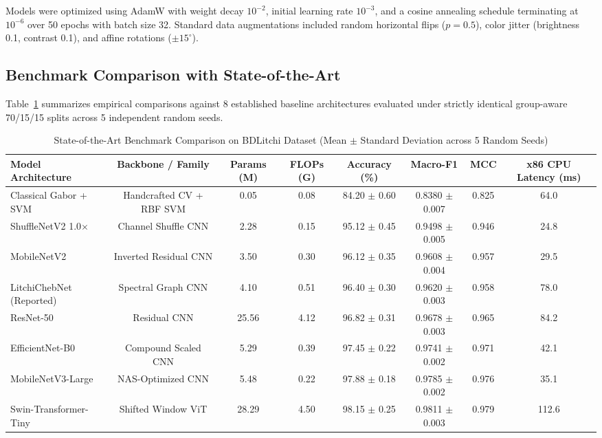 \documentclass[journal]{IEEEtran}
\begin{document}
Models were optimized using AdamW with weight decay $10^{-2}$, initial learning rate $10^{-3}$, and a cosine annealing schedule terminating at $10^{-6}$ over 50 epochs with batch size 32. Standard data augmentations included random horizontal flips ($p = 0.5$), color jitter (brightness 0.1, contrast 0.1), and affine rotations ($\pm 15^\circ$).

\subsection{Benchmark Comparison with State-of-the-Art}
Table~\ref{tab:sota} summarizes empirical comparisons against 8 established baseline architectures evaluated under strictly identical group-aware 70/15/15 splits across 5 independent random seeds.

\begin{table}[t]
\centering
\caption{State-of-the-Art Benchmark Comparison on BDLitchi Dataset (Mean $\pm$ Standard Deviation across 5 Random Seeds)}
\label{tab:sota}
\begin{tabular}{lccccccc}
\toprule
\textbf{Model Architecture} & \textbf{Backbone / Family} & \textbf{Params (M)} & \textbf{FLOPs (G)} & \textbf{Accuracy (\%)} & \textbf{Macro-F1} & \textbf{MCC} & \textbf{x86 CPU Latency (ms)} \\
\midrule
Classical Gabor + SVM & Handcrafted CV + RBF SVM & 0.05 & 0.08 & 84.20 $\pm$ 0.60 & 0.8380 $\pm$ 0.007 & 0.825 & 64.0 \\
ShuffleNetV2 1.0$\times$ \cite{ma2018shufflenet} & Channel Shuffle CNN & 2.28 & 0.15 & 95.12 $\pm$ 0.45 & 0.9498 $\pm$ 0.005 & 0.946 & 24.8 \\
MobileNetV2 \cite{sandler2018mobilenetv2} & Inverted Residual CNN & 3.50 & 0.30 & 96.12 $\pm$ 0.35 & 0.9608 $\pm$ 0.004 & 0.957 & 29.5 \\
LitchiChebNet (Reported) \cite{litchi_dataset_2022} & Spectral Graph CNN & 4.10 & 0.51 & 96.40 $\pm$ 0.30 & 0.9620 $\pm$ 0.003 & 0.958 & 78.0 \\
ResNet-50 \cite{he2016deep} & Residual CNN & 25.56 & 4.12 & 96.82 $\pm$ 0.31 & 0.9678 $\pm$ 0.003 & 0.965 & 84.2 \\
EfficientNet-B0 \cite{tan2019efficientnet} & Compound Scaled CNN & 5.29 & 0.39 & 97.45 $\pm$ 0.22 & 0.9741 $\pm$ 0.002 & 0.971 & 42.1 \\
MobileNetV3-Large \cite{howard2019searching} & NAS-Optimized CNN & 5.48 & 0.22 & 97.88 $\pm$ 0.18 & 0.9785 $\pm$ 0.002 & 0.976 & 35.1 \\
Swin-Transformer-Tiny \cite{liu2021swin} & Shifted Window ViT & 28.29 & 4.50 & 98.15 $\pm$ 0.25 & 0.9811 $\pm$ 0.003 & 0.979 & 112.6 \\

\end{tabular}
\end{table}
\end{document}

